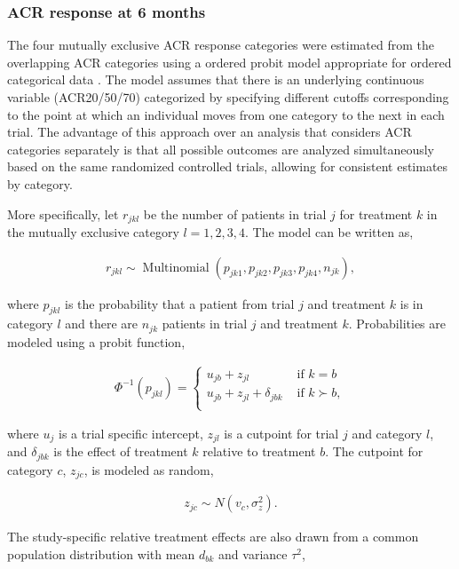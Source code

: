 \documentclass[11pt,final,fleqn]{article}
\theoremstyle{plain}
\DeclareMathOperator{\Multinomial}{Multinomial}
\begin{document}
\begin{appendices}
\subsubsection{ACR response at 6 months}
The four mutually exclusive ACR response categories were estimated from the overlapping ACR categories using a ordered probit model appropriate for ordered categorical data \citep{dias2013evidence}. The model assumes that there is an underlying continuous variable (ACR20/50/70) categorized by specifying different cutoffs corresponding to the point at which an individual moves from one category to the next in each trial. The advantage of this approach over an analysis that considers ACR categories separately is that all possible outcomes are analyzed simultaneously based on the same randomized controlled trials, allowing for consistent estimates by category. 

More specifically, let $r_{jkl}$ be the number of patients in trial $j$ for treatment $k$ in the mutually exclusive category $l = 1,2,3,4$. The model can be written as,

\begin{align}
r_{jkl} \sim \Multinomial(p_{jk1}, p_{jk2}, p_{jk3}, p_{jk4}, n_{jk}),
\end{align}

where $p_{jkl}$ is the probability that a patient from trial $j$ and treatment $k$ is in category $l$ and there are $n_{jk}$ patients in trial $j$ and treatment $k$. Probabilities are modeled using a probit function,

\begin{align}
\Phi^{-1}(p_{jkl}) =
 \begin{cases}
     u_{jb} + z_{jl} & \text{ if } k = b \\
     u_{jb} + z_{jl} + \delta_{jbk} & \text{ if } k \succ b, \\
  \end{cases}
\end{align}

where $u_j$ is a trial specific intercept, $z_{jl}$ is a cutpoint for trial $j$ and category $l$, and $\delta_{jbk}$ is the effect of treatment $k$ relative to treatment $b$. The cutpoint for category $c$, $z_{jc}$, is modeled as random,

\begin{align}
z_{jc} \sim N(v_c, \sigma^2_z).
\end{align}

The study-specific relative treatment effects are also drawn from a common population distribution with mean $d_{bk}$ and variance $\tau^2$,


\end{appendices}
\end{document}
